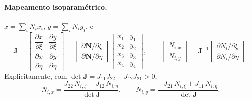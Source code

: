 \documentclass[11pt,a4paper]{article}
\begin{document}
\paragraph{Mapeamento isoparamétrico.} $x=\sum_iN_ix_i$, $y=\sum_iN_iy_i$, e
\begin{equation*}
\boxed{\mathbf J=\begin{bmatrix}
\dfrac{\partial x}{\partial\xi}&\dfrac{\partial y}{\partial\xi}\\[6pt]
\dfrac{\partial x}{\partial\eta}&\dfrac{\partial y}{\partial\eta}
\end{bmatrix}
=\begin{bmatrix}\partial\mathbf N/\partial\xi\\ \partial\mathbf N/\partial\eta\end{bmatrix}
\begin{bmatrix}x_1&y_1\\x_2&y_2\\x_3&y_3\\x_4&y_4\end{bmatrix},
\qquad
\begin{bmatrix}N_{i,x}\\ N_{i,y}\end{bmatrix}
=\mathbf J^{-1}
\begin{bmatrix}\partial N_i/\partial\xi\\ \partial N_i/\partial\eta\end{bmatrix}.}
\end{equation*}
Explicitamente, com $\det\mathbf J=J_{11}J_{22}-J_{12}J_{21}>0$,
\begin{equation*}
N_{i,x}=\frac{J_{22}\,N_{i,\xi}-J_{12}\,N_{i,\eta}}{\det\mathbf J},\qquad
N_{i,y}=\frac{-J_{21}\,N_{i,\xi}+J_{11}\,N_{i,\eta}}{\det\mathbf J}.
\end{equation*}
\end{document}
